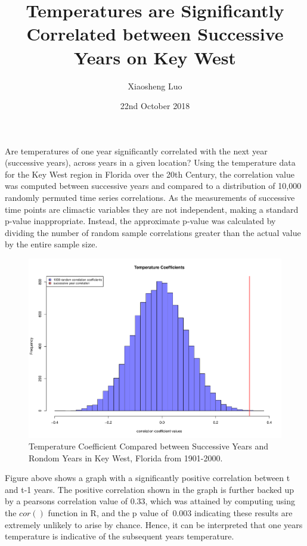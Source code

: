 \documentclass[12pt]{article}
\title{Temperatures are Significantly Correlated between Successive Years on Key West}
\author{Xiaosheng Luo}
\date{22nd October 2018}
\begin{document}
\maketitle
Are temperatures of one year significantly correlated with the next year (successive years), across years in a given location? Using the temperature data for the Key West region in Florida over the 20th Century, the correlation value was computed between successive years and compared to a distribution of 10,000 randomly permuted time series correlations. As the measurements of successive time points are climactic variables they are not independent, making a standard p-value inappropriate. Instead, the approximate p-value was calculated by dividing the number of random sample correlations greater than the actual value by the entire sample size.
\begin{figure}[H]
	\centering
	\includegraphics[scale=.3]{../results/TAutoCorr.pdf}
	\caption{Temperature Coefficient Compared between Successive Years and Rondom Years in Key West, Florida from 1901-2000.}
\end{figure}


Figure above shows a graph with a significantly positive correlation between t and t-1 years. The positive correlation shown in the graph is further backed up by a pearsons correlation value of 0.33, which was attained by computing using the $cor()$ function in R, and the p value of $~ 0.003$ indicating these results are extremely unlikely to arise by chance. Hence, it can be interpreted that one years temperature is indicative of the subsequent years temperature.
\end{document}
